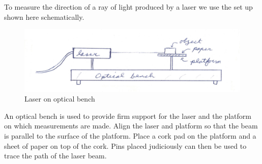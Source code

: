 To measure the direction of a ray of light produced by a laser we use the set up shown here schematically.

\begin{figure}
	\centering
	\includegraphics[scale=0.8]{5bgraf/fig_14}
	\caption{Laser on optical bench}
	\label{f:fig14}
\end{figure}

An optical bench is used to provide firm support for the laser and the platform on which measurements are made.  Align the laser and platform so that the beam is parallel to the surface of the platform.  Place a cork pad on the platform and a sheet of paper on top of the cork.  Pins placed judiciously can then be used to trace the path of the laser beam.

